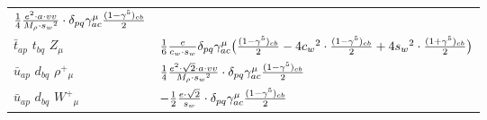 \begin{center}
\begin{tabular}{|l|l|}
	$\frac{1}{4}\frac{ e{}^2  \cdot a \cdot vv}{ M_{\rho} \cdot s_w{}^2 }\cdot \delta_{p q} \gamma_{a c}^\mu {(1-\gamma^5)_{c b}\over 2} $\\[2mm]
$\bar{t}{}_{a p }$ \phantom{-} $t{}_{b q }$ \phantom{-} ${Z}_{\mu }$ \phantom{-}  &
	$\frac{1}{6}\frac{ e}{ c_w \cdot s_w}\delta_{p q} \gamma_{a c}^\mu \big({(1-\gamma^5)_{c b}\over 2} -4 c_w{}^2 \cdot {(1-\gamma^5)_{c b}\over 2} +4 s_w{}^2 \cdot {(1+\gamma^5)_{c b}\over 2} \big)$\\[2mm]
$\bar{u}{}_{a p }$ \phantom{-} $d{}_{b q }$ \phantom{-} $\rho^+{}_{\mu }$ \phantom{-}  &
	$\frac{1}{4}\frac{ e{}^2  \cdot\sqrt{2} \cdot a \cdot vv}{ M_{\rho} \cdot s_w{}^2 }\cdot \delta_{p q} \gamma_{a c}^\mu {(1-\gamma^5)_{c b}\over 2} $\\[2mm]
$\bar{u}{}_{a p }$ \phantom{-} $d{}_{b q }$ \phantom{-} $W^+{}_{\mu }$ \phantom{-}  &
	$-\frac{1}{2}\frac{ e \cdot\sqrt{2}}{ s_w}\cdot \delta_{p q} \gamma_{a c}^\mu {(1-\gamma^5)_{c b}\over 2} $\\ \hline
\end{tabular}


\end{center}
